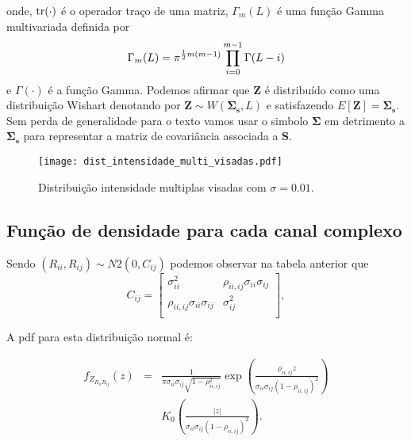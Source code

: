 onde, $\operatorname{tr}(\cdot)$ é o operador traço de uma matriz, $\Gamma_m(L)$ é uma função Gamma multivariada definida por
\begin{equation}\label{cap_acf_10}
	\Gamma_m(L)=\pi^{\frac{1}{2}m(m-1)} \prod_{i=0}^{m-1}\Gamma(L-i) \\
\end{equation}
e $\Gamma(\cdot)$ é a função Gamma. Podemos afirmar que $\mathbf{Z}$ é distribuído como uma distribuição Wishart denotando por $\mathbf{Z}\sim W(\mathbf{\Sigma_{s}}, L)$ e satisfazendo $E[\mathbf{Z}]=\mathbf{\Sigma_{s}}$. Sem perda de generalidade para o texto vamos usar o simbolo $\mathbf{\Sigma}$ em detrimento a $\mathbf{\Sigma_{s}}$ para representar a matriz de covariância associada a $\mathbf{S}$.

\begin{figure}[hbt]
\centering
\texttt{[image: dist\_intensidade\_multi\_visadas.pdf]}
	\caption{Distribuição intensidade multiplas visadas com $\sigma=0.01$.}
\label{fig2}
\end{figure}



\subsection{Função de densidade para cada canal complexo}

Sendo $(R_{ii}, R_{ij})\sim N2(0, C_{ij})$ podemos observar na tabela anterior que 
\begin{equation}
C_{ij}=\left[
\begin{array}{cc}
	\sigma_{ii}^2   &  \rho_{ii,ij}\sigma_{ii}\sigma_{ij}  \\
	\rho_{ii,ij}\sigma_{ii}\sigma_{ij} & \sigma_{ij}^2   \\
\end{array}
\right],
\end{equation}

A pdf para esta distribuição normal é:

\begin{equation}
\begin{array}{ccc}
	f_{Z_{R_{ii}R_{ij}}}(z)&=&\frac{1}{\pi\sigma_{ii}\sigma_{ij}\sqrt{1-\rho_{ii,ij}^2}}\exp\left(\frac{\rho_{ii,ij}z}{\sigma_{ii}\sigma_{ij}(1-\rho_{ii,ij})^2}\right)\\
	&&K_0\left(\frac{|z|}{\sigma_{ii}\sigma_{ij}(1-\rho_{ii,ij})^2}\right).
\end{array}
\end{equation}


